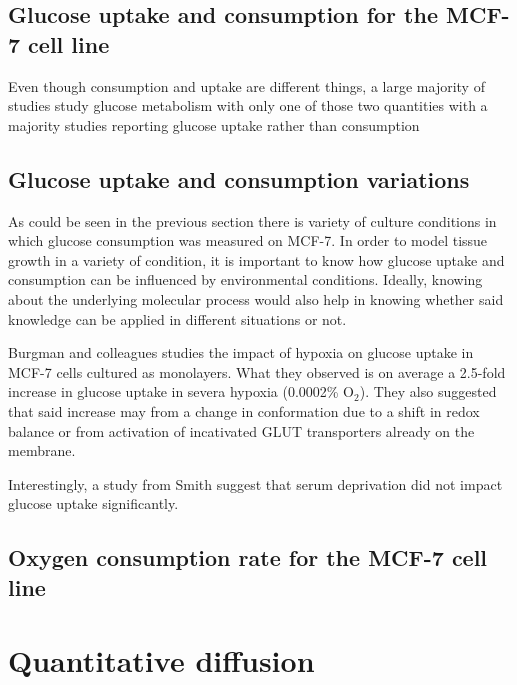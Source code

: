 \documentclass[11pt,a4paper]{article}
\begin{document}
\subsection{Glucose uptake and consumption for the MCF-7 cell line}
Even though consumption and uptake are different things, a large majority of studies study glucose metabolism with only one of those two quantities with a majority studies reporting glucose uptake rather than consumption 

\subsection{Glucose uptake and consumption variations}
As could be seen in the previous section there is variety of culture conditions in which glucose consumption was measured on MCF-7. In order to model tissue growth in a variety of condition, it is important to know how glucose uptake and consumption can be influenced by environmental conditions. Ideally, knowing about the underlying molecular process would also help in knowing whether said knowledge can be applied in different situations or not.

Burgman and colleagues studies the impact of hypoxia on glucose uptake in MCF-7 cells cultured as monolayers. What they observed is on average a 2.5-fold increase in glucose uptake in severa hypoxia (0.0002\% O$_2$). They also suggested that said increase may from a change in conformation due to a shift in redox balance or from activation of incativated GLUT transporters already on the membrane.\cite{Burgman2001}

Interestingly, a study from Smith suggest that serum deprivation did not impact glucose uptake significantly.\cite{Smith1998} 

\subsection{Oxygen consumption rate for the MCF-7 cell line} 
\section{Quantitative diffusion}
\newpage



\end{document}
